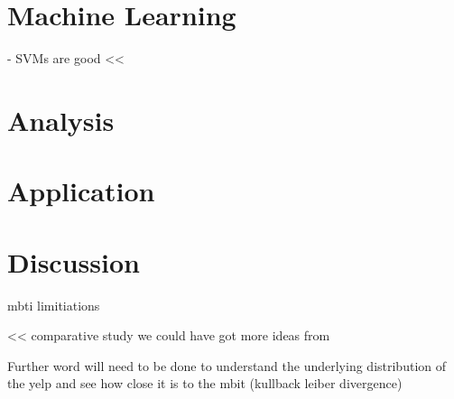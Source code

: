 \documentclass[sigconf, nonacm]{acmart}
\begin{document}
\section{Machine Learning}


\cite{joachims1998text} - SVMs are good <<


\section{Analysis}
\section{Application}
\section{Discussion}

\cite{boyle1995myers} mbti limitiations 

\cite{yang1997comparative} << comparative study we could have got more ideas from 

Further word will need to be done to understand the underlying distribution of the yelp and see how close it is to the mbit (kullback leiber divergence) 




\end{document}
